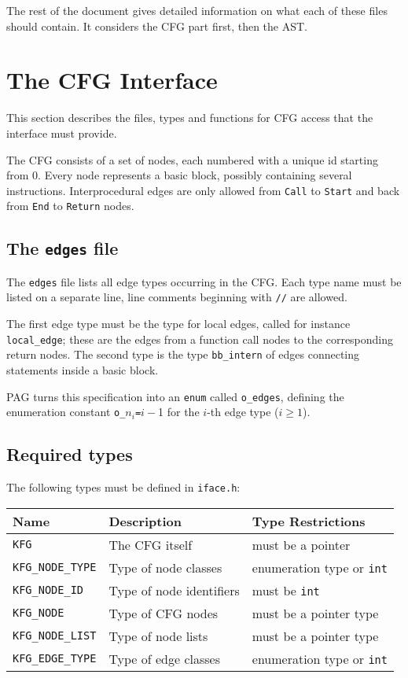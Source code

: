 The rest of the document gives detailed information on what each of
these files should contain. It considers the CFG part first, then
the AST.

\section{The CFG Interface}

This section describes the files, types and functions for CFG access
that the interface must provide.

The CFG consists of a set of nodes, each numbered with a unique id
starting from 0. Every node represents a basic block, possibly
containing several instructions. Interprocedural edges are only
allowed from \verb|Call| to \verb|Start| and back from \verb|End| to
\verb|Return| nodes.

\subsection{The {\tt edges} file}

The \verb|edges| file lists all edge types occurring in the CFG.
Each type name must be listed on a separate line, line comments
beginning with \verb|//| are allowed.

The first edge type must be the type for local edges, called for
instance \verb|local_edge|; these are the edges from a function call
nodes to the corresponding return nodes. The second type is the type
\verb|bb_intern| of edges connecting statements inside a basic block.

PAG turns this specification into an \verb|enum| called
\verb|o_edges|, defining the enumeration constant
\verb|o_|\(n_i\)\verb|=|\(i-\)1 for the \(i\)-th edge type (\(i \ge 1\)).

\subsection{Required types}

The following types must be defined in \verb|iface.h|:

\begin{center}
\begin{tabular}{|l|l|l|}
\hline
Name                 & Description & Type Restrictions \\
\hline
\hline
\verb|KFG|           & The CFG itself
    & must be a pointer \\
\hline
\verb|KFG_NODE_TYPE| & Type of node classes
    & enumeration type or \verb|int| \\
\hline
\verb|KFG_NODE_ID|   & Type of node identifiers
    & must be \verb|int| \\
\hline
\verb|KFG_NODE|      & Type of CFG nodes
    & must be a pointer type \\
\hline
\verb|KFG_NODE_LIST| & Type of node lists
    & must be a pointer type \\
\hline
\verb|KFG_EDGE_TYPE| & Type of edge classes
    & enumeration type or \verb|int| \\
\hline
\end{tabular}
\end{center}

